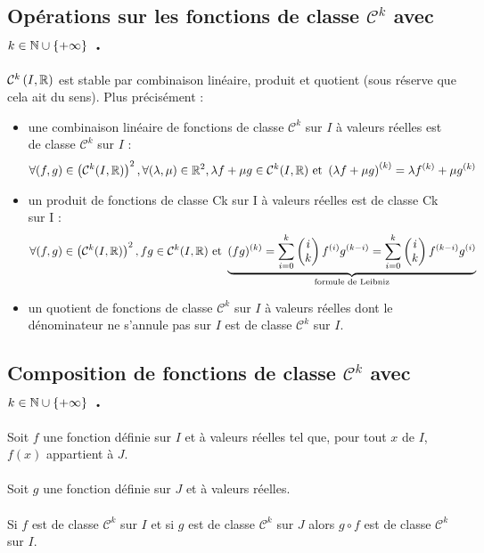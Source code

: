 \subsection{Opérations sur les fonctions de classe \(\mathcal{C}^k\) avec \(k \in \N \union \accol{\pinf}\) .}
\begin{defprop}
    \(\mathcal{C}^k\paren{I,\R}\) est stable par combinaison linéaire, produit et quotient (sous réserve que cela ait du sens).
    Plus précisément :
    \begin{itemize}
        \item une combinaison linéaire de fonctions de classe \(\mathcal{C}^k\) sur \(I\) à valeurs réelles est de classe \(\mathcal{C}^k\) sur \(I\) :
            \[\forall(f, g) \in \paren{\mathcal{C}^k(I,\R)}^2 , \forall(\lambda, \mu ) \in \R^2, \lambda f + \mu g \in \mathcal{C}^k(I,\R)\text{ et }\paren{\lambda f + \mu g}^{(k)} = \lambda f ^{(k)} + \mu g^{(k)}\]
        \item un produit de fonctions de classe Ck sur I à valeurs réelles est de classe Ck sur I :
            \[\forall(f, g) \in \paren{\mathcal{C}^k(I,\R)}^2 , f g \in \mathcal{C}^k(I,\R)\text{ et }\underbrace{(f g)^{(k)} = \sum_{i=0}^{k}\binom{k}{i}f^{(i)}g^{(k-i)} = \sum_{i=0}^k\binom{k}{i}f^{(k-i)}g^{(i)}}_{\text{formule de Leibniz}}\]
        \item un quotient de fonctions de classe \(\mathcal{C}^k\) sur \(I\) à valeurs réelles dont le dénominateur ne s’annule pas sur \(I\) est de classe \(\mathcal{C}^k\) sur \(I\).
    \end{itemize}
\end{defprop}

\subsection{Composition de fonctions de classe \(\mathcal{C}^k\) avec \(k \in \N \union \accol{\pinf}\) .}
\begin{defprop}
    Soit \(f\) une fonction définie sur \(I\) et à valeurs réelles tel que, pour tout \(x\) de \(I\), \(f (x)\) appartient à \(J\).\\~\\
    Soit \(g\) une fonction définie sur \(J\) et à valeurs réelles.\\~\\
    Si \(f\) est de classe  \(\mathcal{C}^k\) sur \(I\) et si \(g\) est de classe  \(\mathcal{C}^k\) sur \(J\) alors \(g \circ f\) est de classe \(\mathcal{C}^k\) sur \(I\).
\end{defprop}

